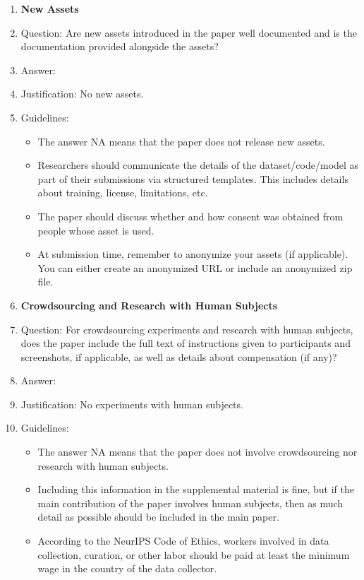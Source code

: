 \documentclass{article}
\theoremstyle{plain}
\theoremstyle{definition}
\theoremstyle{remark}
\theoremstyle{remark}
\begin{document}
\begin{enumerate}
\item {\bf New Assets}
    \item[] Question: Are new assets introduced in the paper well documented and is the documentation provided alongside the assets?
    \item[] Answer: \answerNA{} %
    \item[] Justification: No new assets.
    \item[] Guidelines:
    \begin{itemize}
        \item The answer NA means that the paper does not release new assets.
        \item Researchers should communicate the details of the dataset/code/model as part of their submissions via structured templates. This includes details about training, license, limitations, etc. 
        \item The paper should discuss whether and how consent was obtained from people whose asset is used.
        \item At submission time, remember to anonymize your assets (if applicable). You can either create an anonymized URL or include an anonymized zip file.
    \end{itemize}

\item {\bf Crowdsourcing and Research with Human Subjects}
    \item[] Question: For crowdsourcing experiments and research with human subjects, does the paper include the full text of instructions given to participants and screenshots, if applicable, as well as details about compensation (if any)? 
    \item[] Answer: \answerNA{} %
    \item[] Justification: No experiments with human subjects.
    \item[] Guidelines:
    \begin{itemize}
        \item The answer NA means that the paper does not involve crowdsourcing nor research with human subjects.
        \item Including this information in the supplemental material is fine, but if the main contribution of the paper involves human subjects, then as much detail as possible should be included in the main paper. 
        \item According to the NeurIPS Code of Ethics, workers involved in data collection, curation, or other labor should be paid at least the minimum wage in the country of the data collector. 
    \end{itemize}


\end{enumerate}
\end{document}
